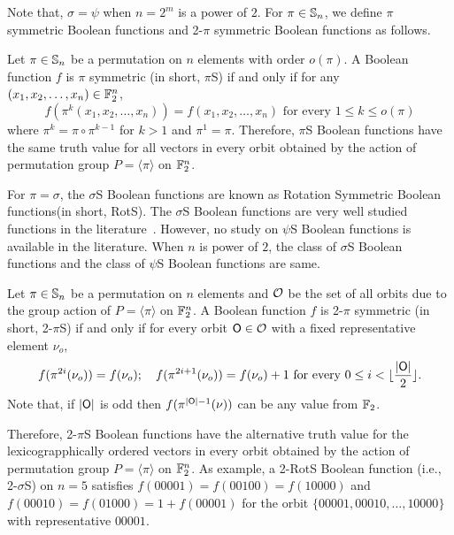 \documentclass{llncs}
\begin{document}
Note that, $\sigma = \psi$ when $n = 2^m$ is a power of $2$.
For $\pi\in \mathbb{S}_n$, we define $\pi$ symmetric Boolean functions and 2-$\pi$ symmetric Boolean functions as follows.
\begin{definition}\label{def:PSBF}
Let $\pi \in \mathbb{S}_n$ be a permutation on $n$ elements with order $o(\pi)$.
A Boolean function $f$ is $\pi$ symmetric (in short, $\pi$S) if and only if for any $(x_1,x_2,\ldots,x_n)\in \mathbb{F}_2^n$, $$f(\pi^k(x_1,x_2,\ldots,x_n))= f(x_1,x_2,\ldots,x_n) \text{ for every } 1 \leq k \leq o(\pi)$$ where $\pi^k = \pi \circ \pi^{k-1}$ for $k > 1$ and $\pi^1 = \pi$.
Therefore, $\pi$S Boolean functions have the same truth value for all vectors in every orbit obtained by the action of permutation group $P = \langle \pi \rangle$ on $\mathbb{F}_2^n$. 
\end{definition}
For $\pi = \sigma$, the $\sigma$S Boolean functions are known as Rotation Symmetric Boolean functions(in short, RotS). The $\sigma$S Boolean functions are very well studied functions in the literature~\cite{JUSC:PQ99,DM:CS02,DAM:StaMai08}. However, no study on $\psi$S Boolean functions is available in the literature. When $n$ is power of $2$, the class of $\sigma$S Boolean functions and the class of $\psi$S Boolean functions are same.

\begin{definition}\label{def:2PSBF}
Let $\pi \in \mathbb{S}_n$ be a permutation on $n$ elements and $\mathcal{O}$ be the set of all orbits due to the group action of $P = \langle \pi \rangle$ on $\mathbb{F}_2^n$.
A Boolean function $f$ is 2-$\pi$ symmetric (in short, 2-$\pi$S) if and only if for every orbit $\mathsf{O} \in \mathcal{O}$ with a fixed representative element $\nu_o$,
$$f(\pi^{2i}(\nu_o)) = f(\nu_o);~~~ f(\pi^{2i+1}(\nu_o)) = f(\nu_o)+1 \text{ for every } 0 \leq i < \lfloor\frac{|\mathsf{O}|}{2}\rfloor.$$
Note that, if $|\mathsf{O}|$ is odd then $f(\pi^{|\mathsf{O}|-1}(\nu))$ can be any value from $\mathbb{F}_2$.
\end{definition}
Therefore, 2-$\pi$S Boolean functions have the alternative truth value for the lexicograpphically ordered vectors in every orbit obtained by the action of permutation group $P = \langle \pi \rangle$ on $\mathbb{F}_2^n$. 
As example, a 2-RotS Boolean function (i.e., 2-$\sigma$S) on $n = 5$ satisfies $f(00001) = f(00100) = f(10000)$ and $f(00010) = f(01000) = 1+f(00001)$ for the orbit $\{00001, 00010, \ldots, 10000\}$ with representative  $00001$.
\end{document}
